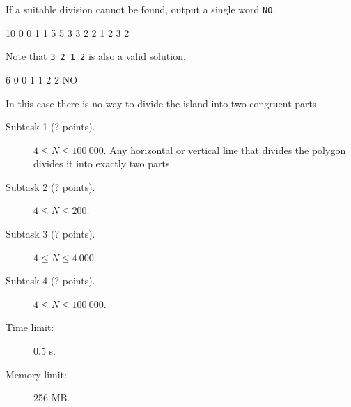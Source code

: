 \documentclass{boi2014}
\newcommand{\constant}[1]{{\tt #1}}
\begin{document}
	If a suitable division cannot be found, output a single word
	\constant{NO}.

    \clearpage

    \Examples
	\example
	{
		10  0  0  1  1  5  5  3  3  2  2
	}
	{
		1 2 3 2
	}
	{
        Note that {\tt 3 2 1 2} is also a valid solution.

        \begin{center}
        \end{center}
    }

    \example
    {
        6  0  0  1  1  2  2
    }
    {
        NO
    }
    {
        In this case there is no way to divide the island into two congruent
        parts.
        \begin{center}
        \end{center}
    }

    \Scoring

    \begin{description}
        \item[Subtask 1 (? points).] $4 \le N \le 100\ 000$.
        Any horizontal or vertical line that divides the polygon divides it into
        exactly two parts.
        
        \item[Subtask 2 (? points).] $4 \le N \le 200$.
        \item[Subtask 3 (? points).] $4 \le N \le 4\ 000$.
        \item[Subtask 4 (? points).] $4 \le N \le 100\ 000$.
    \end{description}

    \Constraints

    \begin{description}
        \item[Time limit:] 0.5 s.
        \item[Memory limit:] 256 MB.
    \end{description}
\end{document}
